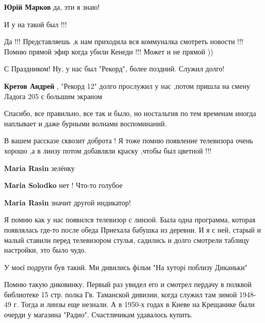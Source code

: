 \begin{itemize}
\begin{itemize}
\begin{itemize}
\textbf{Юрій Марков} да, эти я знаю!
\end{itemize} %

\end{itemize} %

И у на такой был !!!

\begin{itemize} %

Да !!! Представляешь ,к нам приходила вся коммуналка смотреть новости !!! Помню
прямой эфир когда убили Кенеди !!! Может и не прямой ))
\end{itemize} %

С Праздником! Ну, у нас был "Рекорд", более поздний. Служил долго!

\begin{itemize} %
\textbf{Кретов Андрей} , "Рекорд 12" долго прослужил у нас ,потом пришла на смену Ладога 205 с большим экраном
\end{itemize} %

Спасибо, все правильно, все так и было, но ностальгия по тем временам иногда наплывает и даже бурными волнами воспоминаний.


В вашем рассказе сквозит доброта ! Я тоже помню появление телевизора очень
хорошо ,а в линзу потом добавляли краску ,чтобы был цветной !!!

\begin{itemize} %
\textbf{Maria Rasin} зелёнку

\textbf{Maria Solodko} нет ! Что-то голубое

\textbf{Maria Rasin} значит другой индикатор!
\end{itemize} %


Я помню как у нас появился телевизор с линзой. Была одна программа, которая
появлялась где-то после обеда Приехала бабушка из деревни. И я с ней, старый и
малый ставили перед телевизором стулья, садились и долго смотрели таблицу
настройки, это было чудо.

У моєї подруги був такий. Ми дивились фільм "На хуторі поблизу Диканьки"


Помню такую диковинку. Первый раз увидел его и смотрел пердачу в полквой
библиотеке 15 стр. полка Гв. Таманской дивизии, когда служил там зимой 1948-49
г. Тогда и линзы еще незнали. А в 1950-х годах в Киеве на Крещанике были очерди
у магазина "Радио". Счастлвчикам удавалось купить.


\end{itemize}
